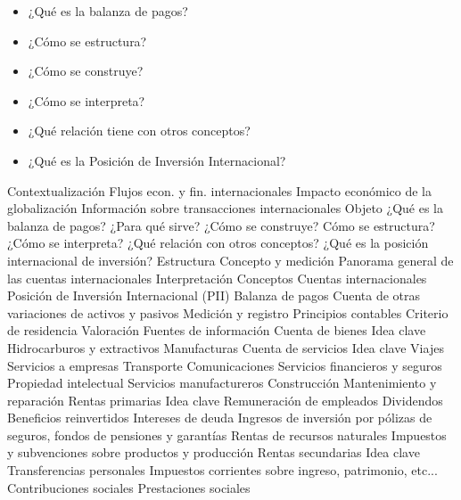 \documentclass{nuevotema}
\begin{document}
\ideaclave

\begin{itemize}
	\item ¿Qué es la balanza de pagos?
	\item ¿Cómo se estructura?
	\item ¿Cómo se construye?
	\item ¿Cómo se interpreta?
	\item ¿Qué relación tiene con otros conceptos?
	\item ¿Qué es la Posición de Inversión Internacional?
\end{itemize}

\esquemacorto

\begin{esquema}[enumerate]
	\1[] 
		\2 Contextualización
			\3 Flujos econ. y fin. internacionales
			\3 Impacto económico de la globalización
			\3 Información sobre transacciones internacionales
		\2 Objeto
			\3 ¿Qué es la balanza de pagos?
			\3 ¿Para qué sirve?
			\3 ¿Cómo se construye?
			\3 Cómo se estructura?
			\3 ¿Cómo se interpreta?
			\3 ¿Qué relación con otros conceptos?
			\3 ¿Qué es la posición internacional de inversión?
		\2 Estructura
			\3 Concepto y medición
			\3 Panorama general de las cuentas internacionales
			\3 Interpretación
	\1 
		\2 Conceptos
			\3 Cuentas internacionales
			\3 Posición de Inversión Internacional (PII)
			\3 Balanza de pagos
			\3 Cuenta de otras variaciones de activos y pasivos
		\2 Medición y registro
			\3 Principios contables
			\3 Criterio de residencia
			\3 Valoración
			\3 Fuentes de información
	\1 
		\2 Cuenta de bienes
			\3 Idea clave
			\3 Hidrocarburos y extractivos
			\3 Manufacturas
		\2 Cuenta de servicios
			\3 Idea clave
			\3 Viajes
			\3 Servicios a empresas
			\3 Transporte
			\3 Comunicaciones
			\3 Servicios financieros y seguros
			\3 Propiedad intelectual
			\3 Servicios manufactureros
			\3 Construcción
			\3 Mantenimiento y reparación
		\2 Rentas primarias
			\3 Idea clave
			\3 Remuneración de empleados
			\3 Dividendos
			\3 Beneficios reinvertidos
			\3 Intereses de deuda
			\3 Ingresos de inversión por pólizas de seguros, fondos de pensiones y garantías
			\3 Rentas de recursos naturales
			\3 Impuestos y subvenciones sobre productos y producción
		\2 Rentas secundarias
			\3 Idea clave
			\3 Transferencias personales
			\3 Impuestos corrientes sobre ingreso, patrimonio, etc...
			\3 Contribuciones sociales
			\3 Prestaciones sociales

\end{esquema}
\end{document}
